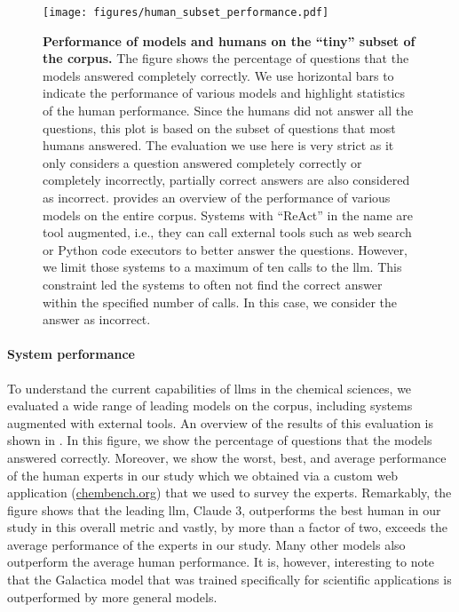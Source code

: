 \documentclass[11pt, oneside]{article}
\begin{document}
\begin{refsection}
\begin{figure}[!h]
    \centering
    \texttt{[image: figures/human\_subset\_performance.pdf]}
    \caption{\textbf{Performance of models and humans on the \enquote{tiny} subset of the  \chembench corpus.} The figure shows the percentage of questions that the models answered completely correctly. We use horizontal bars to indicate the performance of various models and highlight statistics of the human performance. 
    Since the humans did not answer all the questions, this plot is based on the subset of questions that most humans answered.
    The evaluation we use here is very strict as it only considers a question answered completely correctly or completely incorrectly, partially correct answers are also considered as incorrect.
     provides an overview of the performance of various models on the entire corpus.
    Systems with \enquote{ReAct} in the name are tool augmented, i.e., they can call external tools such as web search or Python code executors to better answer the questions.
    However, we limit those systems to a maximum of ten calls to the \gls{llm}. This constraint led the systems to often not find the correct answer within the specified number of calls.
    In this case, we consider the answer as incorrect. 
    }
    \label{fig:human_vs_models_bar}
\end{figure}

\paragraph{System performance} 
To understand the current capabilities of \glspl{llm} in the chemical sciences, we evaluated a wide range of leading models\autocite{Huggingface} on the \chembench corpus, including systems augmented with external tools.
An overview of the results of this evaluation is shown in . 
In this figure, we show the percentage of questions that the models answered correctly.
Moreover, we show the worst, best, and average performance of the human experts in our study which we obtained via a custom web application (\url{chembench.org}) that we used to survey the experts.
Remarkably, the figure shows that the leading \gls{llm}, Claude 3, outperforms the best human in our study in this overall metric and vastly, by more than a factor of two, exceeds the average performance of the experts in our study.
Many other models also outperform the average human performance. It is, however, interesting to note that the Galactica model that was trained specifically for scientific applications is outperformed by more general models.


\end{refsection}
\end{document}

